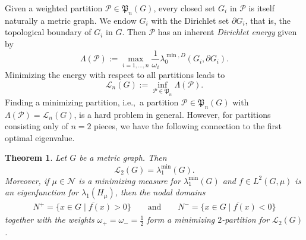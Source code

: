 \documentclass[reqno]{amsart}
\theoremstyle{plain}
\newtheorem{thm}{Theorem}[section]
\theoremstyle{definition}
\theoremstyle{remark}
\numberwithin{equation}{section}
\newcommand{\cN}{\mathcal{N}}
\newcommand{\cP}{\mathcal{P}}   %
\begin{document}
Given a weighted partition $\cP \in \mathfrak{P}_n(G)$, every closed set $G_i$ in $\cP$ is itself naturally a metric graph. We endow $G_i$ with the Dirichlet set $\partial G_i$, that is, the topological boundary of $G_i$ in $G$. Then $\cP$ has an inherent \emph{Dirichlet energy} given by
\[
\Lambda (\cP) := \max_{i =1, \dots,n} \frac{1}{\omega_i}\lambda_{0}^{\min, D} (G_i, \partial G_i). 
\]  
Minimizing the energy with respect to all partitions leads to 
\[
\mathcal{L}_{n} (G) := \inf_{\cP \in \mathfrak{P}_n} \Lambda (\cP). 
\]
Finding a minimizing partition, i.e.,~a partition $\cP \in \mathfrak{P}_n(G)$ with $\Lambda (\cP) = \mathcal{L}_{n} (G)$, is a hard problem in general. However, for partitions consisting only of $n=2$ pieces, we have the following connection to the first optimal eigenvalue. 
\begin{thm} \label{thm:SpectralPartitioning}
Let $G$ be a metric graph. Then 
\[
\mathcal{L}_2(G) = \lambda_{1}^{\min}(G). 
\]
Moreover, if $\mu \in \cN$ is a minimizing measure for $\lambda_1^{\min}(G)$ and $f \in L^2 (G, \mu)$ is an eigenfunction for $\lambda_1(H_\mu)$, then the nodal domains
\begin{align*}
	N^+= \overline{\{x \in G\;|\; f(x)> 0\}} \qquad \text{and} \qquad N^-= \overline{\{x \in G\;|\; f(x) < 0\}}
\end{align*}
together with the weights $\omega_+ = \omega_- = \frac{1}{2}$ form a minimizing $2$-partition for $\mathcal{L}_2(G)$.
\end{thm}
\end{document}
